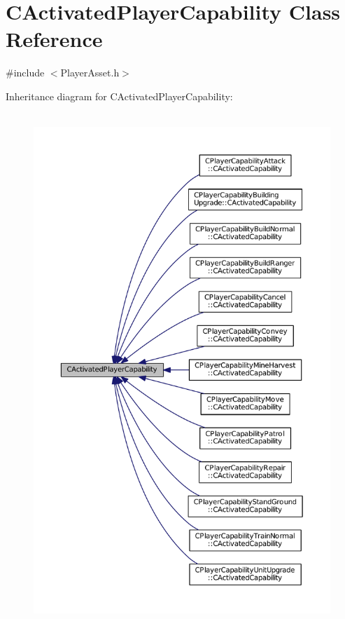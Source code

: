 \hypertarget{classCActivatedPlayerCapability}{}\section{C\+Activated\+Player\+Capability Class Reference}
\label{classCActivatedPlayerCapability}


{\ttfamily \#include $<$Player\+Asset.\+h$>$}



Inheritance diagram for C\+Activated\+Player\+Capability\+:
\nopagebreak
\begin{figure}[H]
\begin{center}
\leavevmode
\includegraphics[height=550pt]{classCActivatedPlayerCapability__inherit__graph}
\end{center}
\end{figure}
